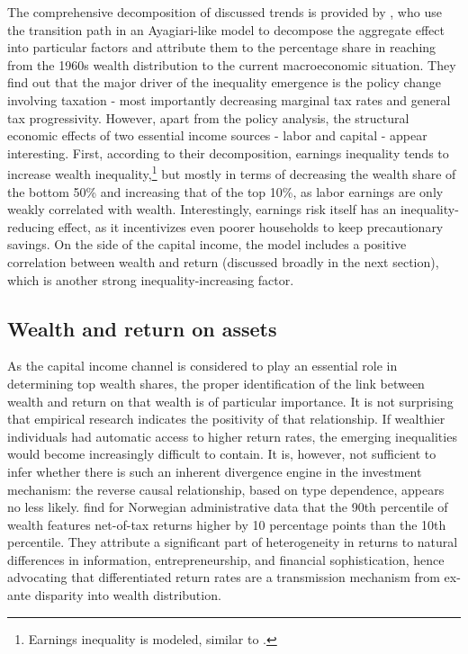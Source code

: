 \documentclass[12pt]{article}
\begin{document}
The comprehensive decomposition of discussed trends is provided by \textcite{hubmer2021}, who use the transition path in an Ayagiari-like model to decompose the aggregate effect into particular factors and attribute them to the percentage share in reaching from the 1960s wealth distribution to the current macroeconomic situation. They find out that the major driver of the inequality emergence is the policy change involving taxation - most importantly decreasing marginal tax rates and general tax progressivity. However, apart from the policy analysis, the structural economic effects of two essential income sources - labor and capital - appear interesting. First, according to their decomposition, earnings inequality tends to increase wealth inequality,\footnote{Earnings inequality is modeled, similar to \textcite{castaneda2003}.}  but mostly in terms of decreasing the wealth share of the bottom 50\% and increasing that of the top 10\%, as labor earnings are only weakly correlated with wealth. Interestingly, earnings risk itself has an inequality-reducing effect, as it incentivizes even poorer households to keep precautionary savings. On the side of the capital income, the model includes a positive correlation between wealth and return (discussed broadly in the next section), which is another strong inequality-increasing factor.

\subsection{Wealth and return on assets}

As the capital income channel is considered to play an essential role in determining top wealth shares, the proper identification of the link between wealth and return on that wealth is of particular importance. It is not surprising that empirical research indicates the positivity of that relationship. If wealthier individuals had automatic access to higher return rates, the emerging inequalities would become increasingly difficult to contain. It is, however, not sufficient to infer whether there is such an inherent divergence engine in the investment mechanism: the reverse causal relationship, based on type dependence, appears no less likely. \textcite{fagereng2020} find for Norwegian administrative data that the 90th percentile of wealth features net-of-tax returns higher by 10 percentage points than the 10th percentile. They attribute a significant part of heterogeneity in returns to natural differences in information, entrepreneurship, and financial sophistication, hence advocating that differentiated return rates are a transmission mechanism from ex-ante disparity into wealth distribution.
\end{document}
